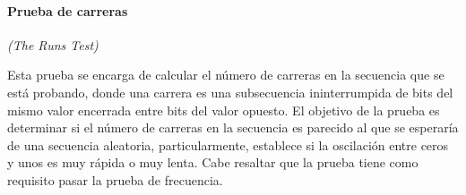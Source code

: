 

\paragraph{Prueba de carreras} %
\textit{(The Runs Test)}

Esta prueba se encarga de calcular el número de carreras en la secuencia que 
se está probando, donde una carrera es una subsecuencia ininterrumpida de 
bits del mismo valor encerrada entre bits del valor opuesto. El objetivo de 
la prueba es determinar si el número de carreras en la secuencia es parecido 
al que se esperaría de una secuencia aleatoria, particularmente, establece si 
la oscilación entre ceros y unos es muy rápida o muy lenta. Cabe resaltar que 
la prueba tiene como requisito pasar la prueba de frecuencia.



